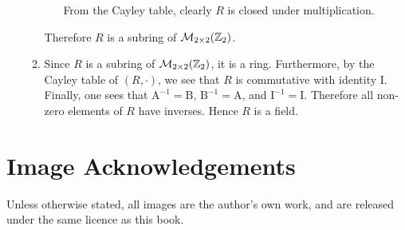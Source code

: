 \begin{enumerate}
\begin{enumerate}[label=(\roman*)]
\begin{itemize}
            From the Cayley table, clearly $R$ is closed under multiplication.
        \end{itemize}
        Therefore $R$ is a subring of $\mathcal{M}_{2\times2}(\mathbb{Z}_{2})$.

        \item Since $R$ is a subring of $\mathcal{M}_{2\times2}(\mathbb{Z}_{2})$, it is a ring. Furthermore, by the Cayley table of $(R, \cdot)$, we see that $R$ is commutative with identity I. Finally, one sees that $\mathrm{A}^{-1} = \mathrm{B}$, $\mathrm{B}^{-1} = \mathrm{A}$, and $\mathrm{I}^{-1} = \mathrm{I}$. Therefore all non-zero elements of $R$ have inverses. Hence $R$ is a field.
    \end{enumerate}
\end{enumerate}
\chapter{Image Acknowledgements}
Unless otherwise stated, all images are the author's own work, and are released under the same licence as this book.

\printbibliography[heading=bibintoc, title={References and Bibliography}]
\printindex


